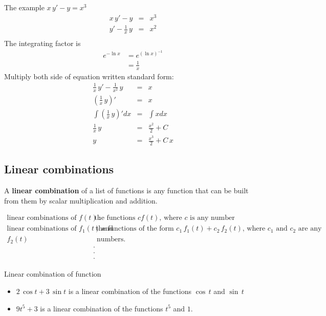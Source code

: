 The example $x\, y' - y = x^3$
\begin{eqnarray*}
  x\, y' - y &=& x^3 \\
  y' - \frac{1}{x}\, y &=& x^2 \\
\end{eqnarray*}
The integrating factor is
\begin{align*}
  e^{- \ln x} &= e^{(\ln x)^{-1}} \\
  &= \frac{1}{x}
\end{align*}
Multiply both side of equation written standard form:
\begin{eqnarray*}
  \frac{1}{x}\,y' - \frac{1}{x^2}\, y &=& x \\
  (\frac{1}{x}\, y)' &=& x \\
  \int (\frac{1}{x}\, y)' dx &=& \int x dx \\
  \frac{1}{x}\, y &=& \frac{x^2}{2} + C\\
  y &=& \frac{x^3}{2} + C\,x
\end{eqnarray*}
\clearpage

\subsection{Linear combinations}
A \textbf{\color{blue} linear combination} of a list of functions is any function
that can be built from them by scalar multiplication and addition.

\begin{align*}
  \text{linear combinations of } f(t)\,
  : &\, \text{the functions } cf(t), \, \text{where $c$ is any number} \\
  \text{linear combinations of } f_1(t)\, \text{and }
    & \text{ the functions of the form } c_1\, f_1(t) + c_2\, f_2(t), \,
      \text{where $c_1$ and $c_2$ are any } \\
  f_2 (t) &\, \text{ numbers.} \\
    & \cdot \\
    & \cdot \\
    & \cdot 
\end{align*}

\begin{example}
  Linear combination of function 
\end{example}
\begin{itemize}
\item $2\, \cos t + 3\, \sin t$ is a linear combination of
  the functions $\cos \, t$ and $\sin \, t$
\item $9t^5 + 3$ is a linear combination of
  the functions $t^5$ and $1$.     
\end{itemize}

